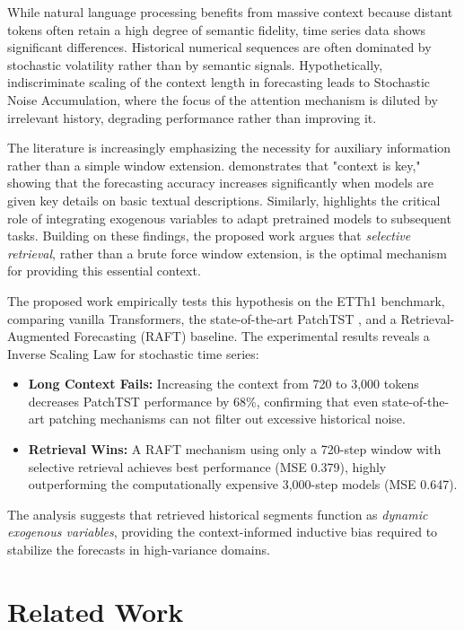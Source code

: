 \documentclass{article} %
\begin{document}
While natural language processing benefits from massive context because distant tokens often retain a high degree of semantic fidelity, time series data shows significant differences. Historical numerical sequences are often dominated by stochastic volatility rather than by semantic signals. Hypothetically, indiscriminate scaling of the context length in forecasting leads to Stochastic Noise Accumulation, where the focus of the attention mechanism is diluted by irrelevant history, degrading performance rather than improving it.

The literature is increasingly emphasizing the necessity for auxiliary information rather than a simple window extension. \cite{williams2024context} demonstrates that "context is key," showing that the forecasting accuracy increases significantly when models are given key details on basic textual descriptions. Similarly, \cite{arango2025chronosx} highlights the critical role of integrating exogenous variables to adapt pretrained models to subsequent tasks. Building on these findings, the proposed work argues that \textit{selective retrieval}, rather than a brute force window extension, is the optimal mechanism for providing this essential context.

The proposed work empirically tests this hypothesis on the ETTh1 benchmark, comparing vanilla Transformers, the state-of-the-art PatchTST \citep{nie2023time}, and a Retrieval-Augmented Forecasting (RAFT) baseline. The experimental results reveals a Inverse Scaling Law for stochastic time series:
\begin{itemize}
    \item \textbf{Long Context Fails:} Increasing the context from 720 to 3,000 tokens decreases PatchTST performance by 68\%, confirming that even state-of-the-art patching mechanisms can not filter out excessive historical noise.
    \item \textbf{Retrieval Wins:} A RAFT mechanism \citep{han2025raft} using only a 720-step window with selective retrieval achieves best performance (MSE 0.379), highly outperforming the computationally expensive 3,000-step models (MSE 0.647).
\end{itemize}

The analysis suggests that retrieved historical segments function as \textit{dynamic exogenous variables}, providing the context-informed inductive bias required to stabilize the forecasts in high-variance domains.

\section{Related Work}
\end{document}

